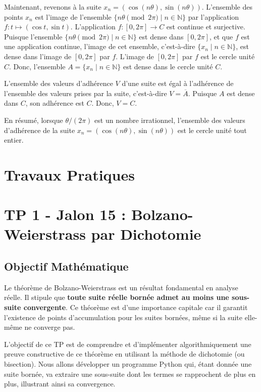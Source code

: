 \documentclass{report}
\begin{document}
Maintenant, revenons à la suite $x_n = (\cos(n\theta), \sin(n\theta))$.
L'ensemble des points $x_n$ est l'image de l'ensemble $\{n\theta \pmod{2\pi} \mid n \in \mathbb{N}\}$ par l'application $f: t \mapsto (\cos t, \sin t)$.
L'application $f: [0, 2\pi] \to C$ est continue et surjective.
Puisque l'ensemble $\{n\theta \pmod{2\pi} \mid n \in \mathbb{N}\}$ est dense dans $[0, 2\pi]$, et que $f$ est une application continue, l'image de cet ensemble, c'est-à-dire $\{x_n \mid n \in \mathbb{N}\}$, est dense dans l'image de $[0, 2\pi]$ par $f$.
L'image de $[0, 2\pi]$ par $f$ est le cercle unité $C$.
Donc, l'ensemble $A = \{x_n \mid n \in \mathbb{N}\}$ est dense dans le cercle unité $C$.

L'ensemble des valeurs d'adhérence $V$ d'une suite est égal à l'adhérence de l'ensemble des valeurs prises par la suite, c'est-à-dire $V = \overline{A}$.
Puisque $A$ est dense dans $C$, son adhérence est $C$.
Donc, $V = C$.

En résumé, lorsque $\theta / (2\pi)$ est un nombre irrationnel, l'ensemble des valeurs d'adhérence de la suite $x_n = (\cos(n\theta), \sin(n\theta))$ est le cercle unité tout entier.

\newpage
\chapter*{Travaux Pratiques}


\chapter*{TP 1 - Jalon 15 : Bolzano-Weierstrass par Dichotomie}

\section*{Objectif Mathématique}

Le théorème de Bolzano-Weierstrass est un résultat fondamental en analyse réelle. Il stipule que \textbf{toute suite réelle bornée admet au moins une sous-suite convergente}. Ce théorème est d'une importance capitale car il garantit l'existence de points d'accumulation pour les suites bornées, même si la suite elle-même ne converge pas.

L'objectif de ce TP est de comprendre et d'implémenter algorithmiquement une preuve constructive de ce théorème en utilisant la méthode de dichotomie (ou bisection). Nous allons développer un programme Python qui, étant donnée une suite bornée, va extraire une sous-suite dont les termes se rapprochent de plus en plus, illustrant ainsi sa convergence.
\end{document}
